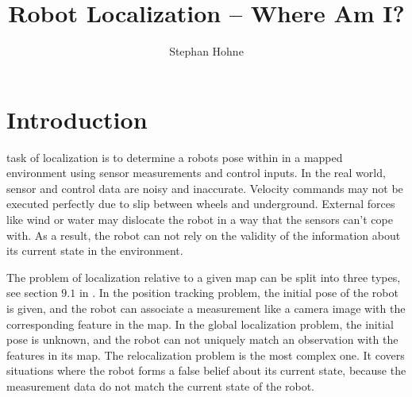 \documentclass[10pt,journal,compsoc]{IEEEtran}
\begin{document}
\title{Robot Localization -- Where Am I?}
\author{Stephan Hohne}

%
{}

\maketitle
\IEEEdisplaynontitleabstractindextext
\IEEEpeerreviewmaketitle
\section{Introduction}
\label{sec:introduction}
 task of localization is to determine a robots pose within in a mapped environment using sensor measurements and control inputs. In the real world, sensor and control data are noisy and inaccurate. Velocity commands may not be executed perfectly due to slip between wheels and underground. External forces like wind or water may dislocate the robot in a way that the sensors can't cope with. As a result, the robot can not rely on the validity of the information about its current state in the environment.

The problem of localization relative to a given map can be split into three types, see section $9.1$ in \cite{principles_of_robot_motion}. In the position tracking problem, the initial pose of the robot is given, and the robot can associate a measurement like a camera image with the corresponding feature in the map. In the global localization problem, the initial pose is unknown, and the robot can not uniquely match an observation with the features in its map. The relocalization problem is the most complex one. It covers situations where the robot forms a false belief about its current state, because the measurement data do not match the current state of the robot.
\end{document}
